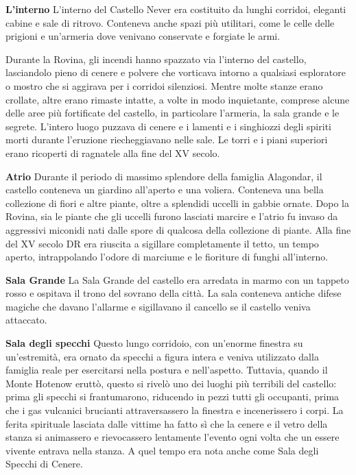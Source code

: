 \documentclass{article}
\begin{document}
\textbf{L'interno}
L'interno del Castello Never era costituito da lunghi corridoi, eleganti cabine e sale di ritrovo. Conteneva anche spazi più utilitari, come le celle delle prigioni e un'armeria dove venivano conservate e forgiate le armi.

Durante la Rovina, gli incendi hanno spazzato via l'interno del castello, lasciandolo pieno di cenere e polvere che vorticava intorno a qualsiasi esploratore o mostro che si aggirava per i corridoi silenziosi. Mentre molte stanze erano crollate, altre erano rimaste intatte, a volte in modo inquietante, comprese alcune delle aree più fortificate del castello, in particolare l'armeria, la sala grande e le segrete. L'intero luogo puzzava di cenere e i lamenti e i singhiozzi degli spiriti morti durante l'eruzione riecheggiavano nelle sale. Le torri e i piani superiori erano ricoperti di ragnatele alla fine del XV secolo.

\textbf{Atrio}
Durante il periodo di massimo splendore della famiglia Alagondar, il castello conteneva un giardino all'aperto e una voliera. Conteneva una bella collezione di fiori e altre piante, oltre a splendidi uccelli in gabbie ornate. Dopo la Rovina, sia le piante che gli uccelli furono lasciati marcire e l'atrio fu invaso da aggressivi miconidi nati dalle spore di qualcosa della collezione di piante. Alla fine del XV secolo DR era riuscita a sigillare completamente il tetto, un tempo aperto, intrappolando l'odore di marciume e le fioriture di funghi all'interno.

\textbf{Sala Grande}
La Sala Grande del castello era arredata in marmo con un tappeto rosso e ospitava il trono del sovrano della città. La sala conteneva antiche difese magiche che davano l'allarme e sigillavano il cancello se il castello veniva attaccato.

\textbf{Sala degli specchi}
Questo lungo corridoio, con un'enorme finestra su un'estremità, era ornato da specchi a figura intera e veniva utilizzato dalla famiglia reale per esercitarsi nella postura e nell'aspetto. Tuttavia, quando il Monte Hotenow eruttò, questo si rivelò uno dei luoghi più terribili del castello: prima gli specchi si frantumarono, riducendo in pezzi tutti gli occupanti, prima che i gas vulcanici brucianti attraversassero la finestra e incenerissero i corpi. La ferita spirituale lasciata dalle vittime ha fatto sì che la cenere e il vetro della stanza si animassero e rievocassero lentamente l'evento ogni volta che un essere vivente entrava nella stanza. A quel tempo era nota anche come Sala degli Specchi di Cenere.
\end{document}
